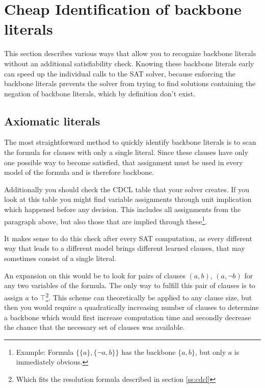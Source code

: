 \section{Cheap Identification of backbone literals}
This section describes various ways that allow you to recognize backbone literals without an additional satisfiability check. Knowing these backbone literals early can speed up the individual calls to the SAT solver, because enforcing the backbone literals prevents the solver from trying to find solutions containing the negation of backbone literals, which by definition don't exist.



\subsection{Axiomatic literals}
\label{subsec:axiomatic}
The most straightforward method to quickly identify backbone literals is to scan the formula for clauses with only a single literal. Since these clauses have only one possible way to become satisfied, that assignment must be used in every model of the formula and is therefore backbone.

Additionally you should check the CDCL table that your solver creates. If you look at this table you might find variable assignments through unit implication which happened before any decision. This includes all assignments from the paragraph above, but also those that are implied through these\footnote{Example: Formula $\{\{a\},\{\neg a, b\}\}$ has the backbone $\{a,b\}$, but only $a$ is immediately obvious.}.

It makes sense to do this check after every SAT computation, as every different way that leads to a different model brings different learned clauses, that may sometimes consist of a single literal.

An expansion on this would be to look for pairs of clauses $(a,b)$, $(a,\neg b)$ for any two variables of the formula. The only way to fulfill this pair of clauses is to assign $a$ to $\top$\footnote{Which fits the resolution formula described in 
section \ref{ss:cdcl}}. This scheme can theoretically be applied to any clause size, but then you would require a quadratically increasing number of clauses to determine a backbone which would first increase computation time and secondly decrease the chance that the necessary set of clauses was available.


